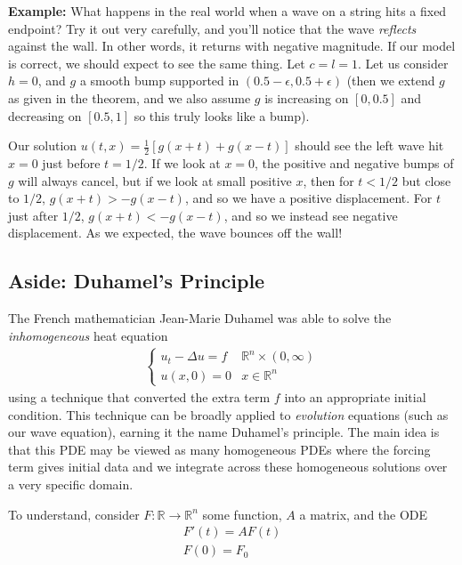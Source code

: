 \documentclass{article}
\newcommand{\R}{{\mathbb{R}}}
\begin{document}
	
	
	\vspace{0.25 cm}
	
	\textbf{Example:}
	What happens in the real world when a wave on a string hits a fixed endpoint? Try it out very carefully, and you'll notice that the wave \textit{reflects} against the wall. In other words, it returns with negative magnitude. If our model is correct, we should expect to see the same thing. Let $c=l=1$. Let us consider $h=0$, and $g$ a smooth bump supported in $(0.5-\epsilon, 0.5+\epsilon)$ (then we extend $g$ as given in the theorem, and we also assume $g$ is increasing on $[0,0.5]$ and decreasing on $[0.5,1]$ so this truly looks like a bump). 
	
	Our solution $u(t,x) = \frac{1}{2}[g(x+t)+g(x-t)]$ should see the left wave hit $x=0$ just before $t=1/2$. If we look at $x=0$, the positive and negative bumps of $g$ will always cancel, but if we look at small positive $x$, then for $t<1/2$ but close to $1/2$, $g(x+t) > -g(x-t)$, and so we have a positive displacement. For $t$ just after $1/2$, $g(x+t) < -g(x-t)$, and so we instead see negative displacement. As we expected, the wave bounces off the wall!
	
	
	\vspace{0.25cm}
	
	\subsection{Aside: Duhamel's Principle}
	
	The French mathematician Jean-Marie Duhamel was able to solve the \textit{inhomogeneous} heat equation 
	\begin{align*}
		\begin{cases}
		u_{t} - \Delta u = f & \R^{n} \times (0,\infty) \\
		u(x,0) = 0 & x \in \R^{n}
		\end{cases}
	\end{align*} using a technique that converted the extra term $f$ into an appropriate initial condition. This technique can be broadly applied to \textit{evolution} equations (such as our wave equation), earning it the name Duhamel's principle. The main idea is that this PDE may be viewed as many homogeneous PDEs where the forcing term gives initial data and we integrate across these homogeneous solutions over a very specific domain.
	
	To understand, consider $F: \R \to \R^{n}$ some function, $A$ a matrix, and the ODE
	\begin{align*}
		F'(t) = AF(t) \\
		F(0) = F_0
	\end{align*}
	
\end{document}
